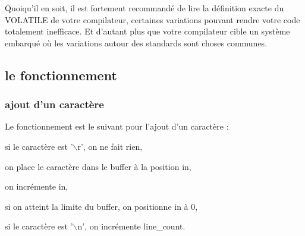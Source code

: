 \documentclass{scrartcl}%
\begin{document}
\eatline
{}\nwendcode{}Quoiqu'il en soit, il est fortement recommandé de lire la définition exacte du {\Tt{}VOLATILE\nwendquote} de votre compilateur, certaines variations pouvant rendre votre code totalement inefficace. Et d'autant plus que votre compilateur cible un système embarqué où les variations autour des standards sont choses communes.
\nwenddocs{}\nwdocspar


\subsection{le fonctionnement}
\subsubsection{ajout d'un caractère}
Le fonctionnement est le suivant pour l'ajout d'un caractère :

\begin{packed_itemize}
  \item si le caractère est '$\backslash$r', on ne fait rien,
  \item on place le caractère dans le buffer à la position {\Tt{}in\nwendquote},
  \item on incrémente {\Tt{}in\nwendquote},
  \item si on atteint la limite du buffer, on positionne {\Tt{}in\nwendquote} à 0,
  \item si le caractère est '$\backslash$n', on incrémente {\Tt{}line{\_}count\nwendquote}.
\end{packed_itemize}
\end{document}
